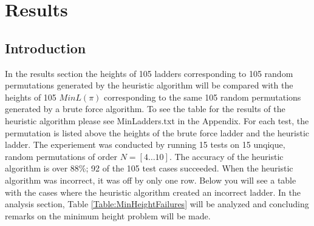 \section{Results}
\subsection{Introduction}
In the results section the heights of 105 ladders corresponding to 105 random permutations generated by the heuristic algorithm 
will be compared with the heights of 105 $MinL(\pi)$ corresponding to the same 105 random permutations generated by a brute force 
algorithm.
To see the table for the results of the heuristic algorithm please see 
MinLadders.txt in the Appendix. For each test, the permutation is listed above the heights of the brute 
force ladder and the heuristic ladder. The experiement was conducted by running 
15 tests on 15 unqique, random permutations of order $N=[4 \dots 10]$.
The accuracy of the heuristic algorithm is 
over 88\%; 92 of the 105 test cases succeeded. When the heuristic algorithm was incorrect, it was off by only one row.
Below you will see a table with the cases where the heuristic algorithm created an incorrect ladder.
In the analysis section, Table \ref{Table:MinHeightFailures} will be analyzed and concluding remarks on the 
minimum height problem will be made.

